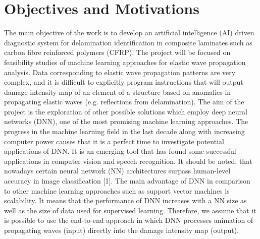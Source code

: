 \section{Objectives and Motivations}
\label{sec14}

The main objective of the work is to develop an artificial intelligence (AI) driven diagnostic system for delamination identification in composite laminates such as carbon fibre reinforced polymers (CFRP). 
The project will be focused on feasibility studies of machine learning approaches for elastic wave propagation analysis. 
Data corresponding to elastic wave propagation patterns are very complex, and it is difficult to explicitly program instructions that will output damage intensity map of an element of a structure based on anomalies in propagating elastic waves (e.g. reflections from delamination). 
The aim of the project is the exploration of other possible solutions which employ deep neural networks (DNN), one of the most promising machine learning approaches. 
The progress in the machine learning field in the last decade along with increasing computer power causes that it is a perfect time to investigate potential applications of DNN. 
It is an emerging tool that has found some successful applications in computer vision and speech recognition. 
It should be noted, that nowadays certain neural network (NN) architectures surpass human-level accuracy in image classification [1]. The main advantage of DNN in comparison to other machine learning approaches such as support vector machines is scalability. 
It means that the performance of DNN increases with a NN size as well as the size of data used for supervised learning. 
Therefore, we assume that it is possible to use the end-to-end approach in which DNN processes animation of propagating waves (input) directly into the damage intensity map (output).


